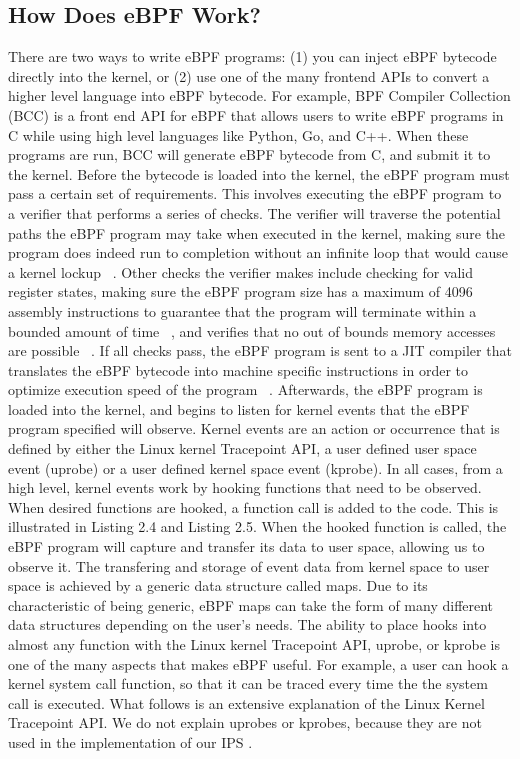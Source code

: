 \documentclass{report}
\begin{document}
\begin{spacing}{1.5}
\subsection{How Does eBPF Work?}


{\large
There are two ways to write eBPF programs: (1) you can inject eBPF bytecode directly into the kernel, or (2) use one of the many frontend APIs to convert a higher level language into eBPF bytecode. For example, BPF Compiler Collection (BCC) is a front end API for eBPF that allows users to write eBPF programs in C while using high level languages like Python, Go, and C++. When these programs are run, BCC will generate eBPF bytecode from C, and submit it to the kernel. Before the bytecode is loaded into the kernel, the eBPF program must pass a certain set of requirements. This involves executing the eBPF program to a verifier that performs a series of checks. The verifier will traverse the potential paths the eBPF program may take when executed in the kernel, making sure the program does indeed run to completion without an infinite loop that would cause a kernel lockup ~\cite{findlay2021practical}. Other checks the verifier makes include checking for valid register states, making sure the eBPF program size has a maximum of 4096 assembly instructions to guarantee that the program will terminate within a bounded amount of time ~\cite{miano2018creating}, and verifies that no out of bounds memory accesses are possible ~\cite{findlay2021practical}. If all checks pass, the eBPF program is sent to a JIT compiler that translates the eBPF bytecode into machine specific instructions in order to optimize execution speed of the program ~\cite{miano2018creating}. Afterwards, the eBPF program is loaded into the kernel, and begins to listen for kernel events that the eBPF program specified will observe. Kernel events are an action or occurrence that is defined by either the Linux kernel Tracepoint API, a user defined user space event (uprobe) or a user defined kernel space event (kprobe). In all cases, from a high level, kernel events work by hooking functions that need to be observed. When desired functions are hooked, a function call is added to the code. This is illustrated in Listing 2.4 and Listing 2.5. When the hooked function is called, the eBPF program will capture and transfer its data to user space, allowing us to observe it. The transfering and storage of event data from kernel space to user space is achieved by a generic data structure called maps. Due to its characteristic of being generic, eBPF maps can take the form of many different data structures depending on the user's needs. The ability to place hooks into almost any function with the Linux kernel Tracepoint API, uprobe, or kprobe is one of the many aspects that makes eBPF useful. For example, a user can hook a kernel system call function, so that it can be traced every time the the system call is executed. What follows is an extensive explanation of the Linux Kernel Tracepoint API. We do not explain uprobes or kprobes, because they are not used in the implementation of our IPS .
\newline
}



\end{spacing}
\end{document}
